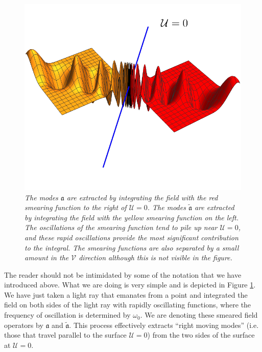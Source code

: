 \documentclass[12pt]{article}
\def \anh {\mathfrak{a}}
\def \tildanh {\widetilde{\mathfrak{a}}}
\def\uent{\mathcal{U}}
\def\vent{\mathcal{V}}
\begin{document}
\begin{figure}[!ht]
\begin{center}
\includegraphics[height=0.4\textheight]{modeextractplot.pdf}
\caption{\em The modes $\anh$ are extracted by integrating the field with the red smearing function to the right of $\uent = 0$. The modes $\tildanh$ are extracted by integrating the field with the yellow smearing function on the left. The oscillations of the smearing function tend to pile up near $\uent=0$, and these rapid oscillations provide the most significant contribution to the integral. The smearing functions are also separated by a small amount in the $\vent$ direction although this is not visible in the figure.\label{fignearhor}}
\end{center}
\end{figure}
The reader should not be intimidated by some of the notation that we have introduced above. What we are doing is very simple and is depicted in Figure \ref{fignearhor}. We have just taken a light ray that emanates from a point and integrated the field on both sides of the light ray with rapidly oscillating functions, where the frequency of oscillation is determined by $\omega_0$.  We are denoting these smeared field operators by $\anh$ and $\tildanh$. This process effectively extracts ``right moving modes'' (i.e. those that travel parallel to the surface $\uent = 0$) from the two sides of the surface at $\uent = 0$.
\end{document}
